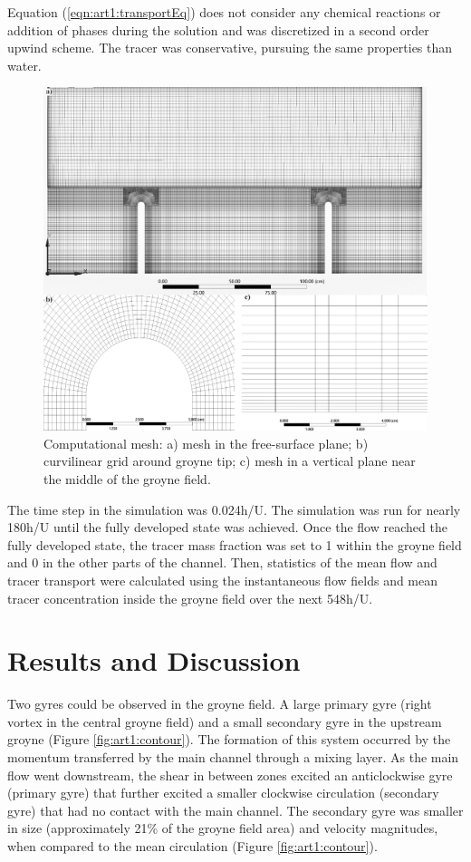 Equation (\ref{eqn:art1:transportEq}) does not consider any chemical reactions or addition of phases during the solution and was discretized in a second order upwind scheme. The tracer was conservative, pursuing the same properties than water.

\begin{figure}[!ht]
\centering
\includegraphics[width=\linewidth]{../images/art1/imgMassExchange2.png}
\caption{Computational mesh: a) mesh in the free-surface plane; b) curvilinear grid around groyne tip; c) mesh in a vertical plane near the middle of the groyne field.}
\label{fig:art1:mesh}
\end{figure}

The time step in the simulation was 0.024h/U. The simulation was run for nearly 180h/U until the fully developed state was achieved. Once the flow reached the fully developed state, the tracer mass fraction was set to 1 within the groyne field and 0 in the other parts of the channel. Then, statistics of the mean flow and tracer transport were calculated using the instantaneous flow fields and mean tracer concentration inside the groyne field over the next 548h/U.

\section{Results and Discussion}
Two gyres could be observed in the groyne field. A large primary gyre (right vortex in the central groyne field) and a small secondary gyre in the upstream groyne (Figure \ref{fig:art1:contour}). The formation of this system occurred by the momentum transferred by the main channel through a mixing layer. As the main flow went downstream, the shear in between zones excited an anticlockwise gyre (primary gyre) that further excited a smaller clockwise circulation (secondary gyre) that had no contact with the main channel. The secondary gyre was smaller in size (approximately 21\% of the groyne field area) and velocity magnitudes, when compared to the mean circulation (Figure \ref{fig:art1:contour}).

